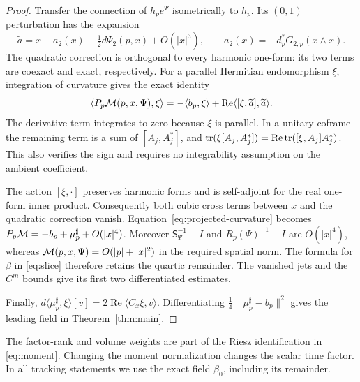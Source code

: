 \begin{proof}
Transfer the connection of $h_pe^\Psi$ isometrically to $h_p$.
Its $(0,1)$ perturbation has the expansion
\[
 \widetilde a=x+a_2(x)-\tfrac12d\Psi_2(p,x)+O(|x|^3),
 \qquad a_2(x)=-d_p^*G_{2,p}(x\wedge x).
\]
The quadratic correction is orthogonal to every harmonic
one-form: its two terms are coexact and exact, respectively.
For a parallel Hermitian endomorphism $\xi$, integration of
curvature gives the exact identity
\begin{equation}\label{eq:projected-curvature}
 \langle P_p\mathcal M(p,x,\Psi),\xi\rangle
 =-\langle b_p,\xi\rangle+
          \operatorname{Re}\langle[\xi,\widetilde a],\widetilde a\rangle.
\end{equation}
The derivative term integrates to zero because $\xi$ is
parallel. In a unitary coframe the remaining term is a sum
of $[A_j,A_j^*]$, and
$\operatorname{tr}(\xi[A_j,A_j^*])
 =\operatorname{Re}\operatorname{tr}([\xi,A_j]A_j^*)$.
This also verifies the sign and requires no integrability
assumption on the ambient coefficient.

The action $[\xi,\cdot]$ preserves harmonic forms and is
self-adjoint for the real one-form inner product. Consequently
both cubic cross terms between $x$ and the quadratic correction
vanish. Equation~\eqref{eq:projected-curvature} becomes
$P_p\mathcal M=-b_p+\mu_p^\sharp+O(|x|^4)$.
Moreover $\mathsf S_\Psi^{-1}-I$ and $R_p(\Psi)^{-1}-I$
are $O(|x|^4)$, whereas
$\mathcal M(p,x,\Psi)=O(|p|+|x|^2)$ in the required spatial norm.
The formula for $\beta$ in \eqref{eq:slice} therefore retains
the quartic remainder. The vanished jets and the $C^m$ bounds
give its first two differentiated estimates.

Finally,
$d\langle\mu_p^\sharp,\xi\rangle[v]
 =2\operatorname{Re}\langle C_x\xi,v\rangle$.
Differentiating $\frac14\|\mu_p^\sharp-b_p\|^2$ gives
the leading field in Theorem~\ref{thm:main}.
\end{proof}

The factor-rank and volume weights are part of the Riesz
identification in \eqref{eq:moment}. Changing the moment
normalization changes the scalar time factor. In all
tracking statements we use the exact field $\beta_0$,
including its remainder.
